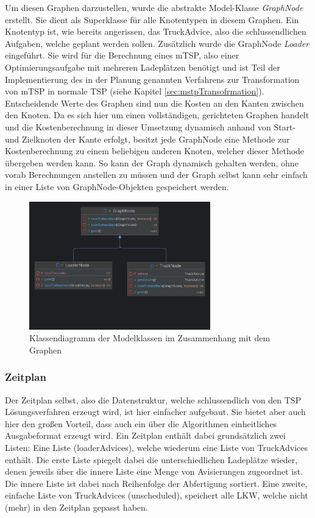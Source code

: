 Um diesen Graphen darzustellen, wurde die abstrakte Model-Klasse \textit{GraphNode} erstellt. Sie dient als Superklasse für alle Knotentypen in diesem Graphen. Ein Knotentyp ist, wie bereits angerissen, das TruckAdvice, also die schlussendlichen Aufgaben, welche geplant werden sollen. Zusätzlich wurde die GraphNode \textit{Loader} eingeführt. Sie wird für die Berechnung eines mTSP, also einer Optimierungsaufgabe mit mehreren Ladeplätzen benötigt und ist Teil der Implementierung des in der Planung genannten Verfahrens zur Transformation von mTSP in normale TSP (siehe Kapitel \ref{sec:mstpTransofrmation}). Entscheidende Werte des Graphen sind nun die Kosten an den Kanten zwischen den Knoten. Da es sich hier um einen vollständigen, gerichteten Graphen handelt und die Kostenberechnung in dieser Umsetzung dynamisch anhand von Start- und Zielknoten der Kante erfolgt, besitzt jede GraphNode eine Methode zur Kostenberechnung zu einem beliebigen anderen Knoten, welcher dieser Methode übergeben werden kann. So kann der Graph dynamisch gehalten werden, ohne vorab Berechnungen anstellen zu müssen und der Graph selbst kann sehr einfach in einer Liste von GraphNode-Objekten gespeichert werden.

\begin{figure}[H]
    \centering
    \includegraphics[width=0.7\textwidth]{images/classDiagrams/TSP_Graph_ClassDiagram.png}
    \caption{Klassendiagramm der Modelklassen im Zusammenhang mit dem Graphen}
    \label{fig:tspClassDiagramGraph}
\end{figure}


\subsubsection{Zeitplan}

Der Zeitplan selbst, also die Datenstruktur, welche schlussendlich von den TSP Lösungsverfahren erzeugt wird, ist hier einfacher aufgebaut. Sie bietet aber auch hier den großen Vorteil, dass auch ein über die Algorithmen einheitliches Ausgabeformat erzeugt wird. Ein Zeitplan enthält dabei grundsätzlich zwei Listen: Eine Liste (loaderAdvices), welche wiederum eine Liste von TruckAdvices enthält. Die erste Liste spiegelt dabei die unterschiedlichen Ladeplätze wieder, denen jeweils über die innere Liste eine Menge von Avisierungen zugeordnet ist. Die innere Liste ist dabei nach Reihenfolge der Abfertigung sortiert. Eine zweite, einfache Liste von TruckAdvices (unscheduled), speichert alle LKW, welche nicht (mehr) in den Zeitplan gepasst haben.

